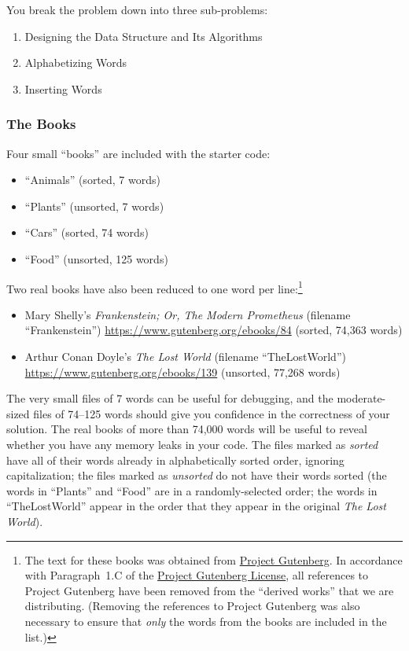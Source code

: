 You break the problem down into three sub-problems:

\begin{enumerate}
    \item Designing the Data Structure and Its Algorithms
    \item Alphabetizing Words
    \item Inserting Words
\end{enumerate}

\subsubsection*{The Books}

Four small ``books'' are included with the starter code:

\begin{itemize}
    \item ``Animals'' (sorted, 7 words)
    \item ``Plants'' (unsorted, 7 words)
    \item ``Cars'' (sorted, 74 words)
    \item ``Food'' (unsorted, 125 words)
\end{itemize}

Two real books have also been reduced to one word per line:\footnote{The text for these books was obtained from \href{https://www.gutenberg.org/}{Project Gutenberg}.
In accordance with Paragraph~1.C of the \href{https://www.gutenberg.org/policy/license}{Project Gutenberg License}, all references to Project Gutenberg have been removed from the ``derived works'' that we are distributing.
    (Removing the references to Project Gutenberg was also necessary to ensure that \textit{only} the words from the books are included in the list.)}

\begin{itemize}
    \item Mary Shelly's \textit{Frankenstein; Or, The Modern Prometheus} (filename ``Frankenstein'') \url{https://www.gutenberg.org/ebooks/84} (sorted, 74,363 words)
    \item Arthur Conan Doyle's \textit{The Lost World} (filename ``TheLostWorld'')
    \url{https://www.gutenberg.org/ebooks/139} (unsorted, 77,268 words)
\end{itemize}

The very small files of 7 words can be useful for debugging, and the moderate-sized files of 74--125 words should give you confidence in the correctness of your solution.
The real books of more than 74,000 words will be useful to reveal whether you have any memory leaks in your code.
The files marked as \textit{sorted} have all of their words already in alphabetically sorted order, ignoring capitalization;
the files marked as \textit{unsorted} do not have their words sorted (the words in ``Plants'' and ``Food'' are in a randomly-selected order;
the words in ``TheLostWorld'' appear in the order that they appear in the original \textit{The Lost World}).

